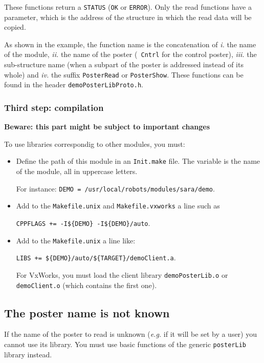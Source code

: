 These functions return a {\tt STATUS} ({\tt OK} or {\tt ERROR}). Only the
read functions have a parameter, which is the address of the structure in
which the read data will be copied.

As shown in the example, the  function name is  the concatenation of {\em
i.} the name  of  the module, {\em ii.}   the  name of the  poster  ({\tt
Cntrl} for the control poster), {\em  iii.}  the sub-structure name (when
a subpart of the poster is addressed instead of  its whole) and {\em iv.}
the suffix {\tt PosterRead} or {\tt PosterShow}.   These functions can be
found in the header {\tt demoPosterLibProto.h}.


\subsubsection{Third step: compilation}

{\bf Beware: this part might be subject to important changes}

To use libraries correspondig to other modules, you must:

\begin{itemize}
\item Define the path of this module in an {\tt Init.make} file. The
variable is the name of the module, all in uppercase letters.

For instance: {\tt DEMO = /usr/local/robots/modules/sara/demo}.

\item Add to the {\tt Makefile.unix} and {\tt Makefile.vxworks} a line
such as

 {\tt CPPFLAGS += -I\$\{DEMO\} -I\$\{DEMO\}/auto}.

\item Add to the {\tt Makefile.unix} a line like:

 {\tt LIBS += \$\{DEMO\}/auto/\$\{TARGET\}/demoClient.a}.

For VxWorks, you must load   the client library {\tt demoPosterLib.o}  or
{\tt demoClient.o} (which contains the first one).

\end{itemize}


\subsection{The poster name is not known}

If the name of the  poster to read is unknown  ({\em e.g.} if it will  be
set by a user) you  cannot use its  library. You must use basic functions
of the generic {\tt posterLib} library instead.

